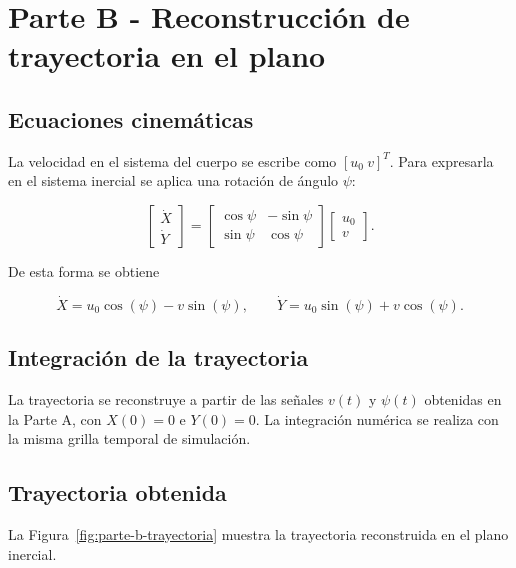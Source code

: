 \section{Parte B - Reconstrucción de trayectoria en el plano}

\subsection{Ecuaciones cinemáticas}

La velocidad en el sistema del cuerpo se escribe como $[u_0\ v]^T$. Para expresarla en el sistema inercial se aplica una rotación de ángulo $\psi$:

\begin{equation}
\begin{bmatrix}
\dot{X} \\
\dot{Y}
\end{bmatrix}
=
\begin{bmatrix}
\cos\psi & -\sin\psi \\
\sin\psi & \cos\psi
\end{bmatrix}
\begin{bmatrix}
u_0 \\
v
\end{bmatrix}.
\end{equation}

De esta forma se obtiene

\begin{equation}
\dot{X} = u_0 \cos(\psi) - v \sin(\psi),
\qquad
\dot{Y} = u_0 \sin(\psi) + v \cos(\psi).
\end{equation}

\subsection{Integración de la trayectoria}

La trayectoria se reconstruye a partir de las señales $v(t)$ y $\psi(t)$ obtenidas en la Parte A, con $X(0)=0$ e $Y(0)=0$. La integración numérica se realiza con la misma grilla temporal de simulación.



\subsection{Trayectoria obtenida}

La Figura~\ref{fig:parte-b-trayectoria} muestra la trayectoria reconstruida en el plano inercial.


